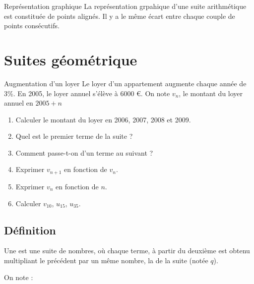 \documentclass[12pt,a4paper]{article}
\begin{document}
\begin{mybilan}{Représentation graphique}
	La représentation grpahique d'une suite arithmétique est constituée de points alignés. Il y a le même écart entre chaque couple de points consécutifs.
\end{mybilan}


\section{Suites géométrique}

\begin{myact}{Augmentation d'un loyer}
	Le loyer d'un appartement augmente chaque année de 3\%. En 2005, le loyer annuel s'élève à 6000 €.
	On note $v_n$, le montant du loyer annuel en $2005 + n$
	
	\begin{enumerate}
		\item Calculer le montant du loyer en 2006, 2007, 2008 et 2009.
		\item Quel est le premier terme de la suite ?
		\item Comment passe-t-on d'un terme au suivant ?
		\item Exprimer $v_{n+1}$ en fonction de $v_n$.
		\item Exprimer $v_n$ en fonction de $n$.
		\item Calculer $v_{10}$, $u_{15}$, $u_{35}$.
	\end{enumerate}
	
\end{myact}


\subsection{Définition}

\begin{mybilan}

		
	Une  est une suite de nombres, où chaque terme, à partir du deuxième est obtenu multipliant le précédent par un même nombre, la  de la suite (notée $q$).	
	
	On note :
		


\end{mybilan}
\end{document}
